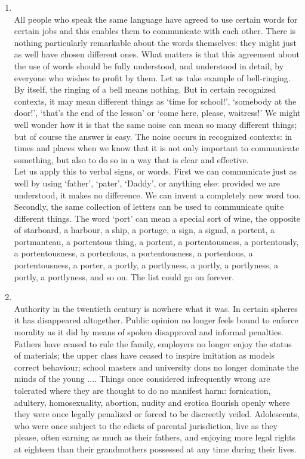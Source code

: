 \documentclass[12pt]{article}
\begin{document}
\begin{enumerate}
    \item {}\\
      All people who speak the same language have agreed to use certain words for certain jobs and this enables them to communicate with each other. There is nothing particularly remarkable about the words themselves: they might just as well have chosen different ones. What matters is that this agreement about the use of words should be fully understood, and understood in detail, by everyone who wishes to profit by them. Let us take example of bell-ringing. By itself, the ringing of a bell means nothing. But in certain recognized contexts, it may mean different things as `time for school!', `somebody at the door!', `that's the end of the lesson' or `come here, please, waitress!' We might well wonder how it is that the same noise can mean so many different things; but of course the answer is easy. The noise occurs in recognized contexts: in times and places when we know that it is not only important to communicate something, but also to do so in a way that is clear and effective.\\

      Let us apply this to verbal signs, or words. First we can communicate just as well by using `father', `pater', `Daddy', or anything else: provided we are understood, it makes no difference. We can invent a completely new word too. Secondly, the same collection of letters can be used to communicate quite different things. The word `port' can mean a special sort of wine, the opposite of starboard, a harbour, a ship, a portage, a sign, a signal, a portent, a portmanteau, a portentous thing, a portent, a portentousness, a portentously, a portentousness, a portentous, a portentousness, a portentous, a portentousness, a porter, a portly, a portlyness, a portly, a portlyness, a portly, a portlyness, and so on. The list could go on forever.

    \item {}\\
      Authority in the twentieth century is nowhere what it was. In certain spheres it has disappeared altogether. Public opinion no longer feels bound to enforce morality as it did by means of spoken disapproval and informal penalties. Fathers have ceased to rule the family, employers no longer enjoy the status of materials; the upper class have ceased to inspire imitation as models correct behaviour; school masters and university dons no longer dominate the minds of the young .... Things once considered infrequently wrong are tolerated where they are thought to do no manifest harm: fornication, adultery, homosexuality, abortion, nudity and erotica flourish openly where they were once legally penalized or forced to be discreetly veiled. Adolescents, who were once subject to the edicts of parental jurisdiction, live as they please, often earning as much as their fathers, and enjoying more legal rights at eighteen than their grandmothers possessed at any time during their lives.\\


\end{enumerate}
\end{document}
